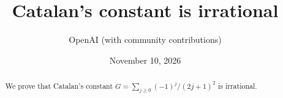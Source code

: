 \documentclass[11pt]{article}
\title{Catalan's constant is irrational}
\author{OpenAI (with community contributions)}
\date{November 10, 2026}
\theoremstyle{definition}
\theoremstyle{remark}
\begin{document}
\maketitle
\begin{abstract}
We prove that Catalan's constant
$G=\sum_{j\geq0}(-1)^j/(2j+1)^2$ is irrational.
\end{abstract}











\begingroup
\raggedright

\endgroup
\end{document}
